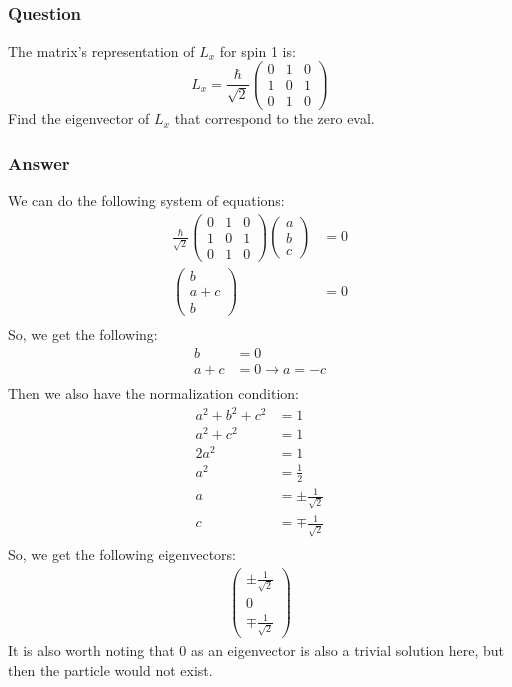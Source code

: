 \documentclass[12pt]{article}
\begin{document}
\subsection{}
\subsubsection{Question}
The matrix's representation of $L_x$ for spin 1 is:
\begin{equation}
L_x = \frac{\hbar}{\sqrt{2}}\begin{pmatrix}
0 & 1 & 0\\
1 & 0 & 1\\
0 & 1 & 0
\end{pmatrix}
\end{equation}
Find the eigenvector of $L_x$ that correspond to the zero eval.
\subsubsection{Answer}
We can do the following system of equations:
\begin{align*}
\frac{\hbar}{\sqrt{2}}\begin{pmatrix}
0 & 1 & 0\\
1 & 0 & 1\\
0 & 1 & 0
\end{pmatrix}\begin{pmatrix}
a\\
b\\
c
\end{pmatrix} &= 0\\
\begin{pmatrix}
b\\
a+c\\
b
\end{pmatrix} &= 0\\
\end{align*}
So, we get the following:
\begin{align*}
b &= 0\\
a+c &= 0\rightarrow a=-c\\
\end{align*}
Then we also have the normalization condition:
\begin{align*}
a^2+b^2+c^2 &= 1\\
a^2+c^2 &= 1\\
2a^2 &= 1\\
a^2 &= \frac{1}{2}\\
a &= \pm \frac{1}{\sqrt{2}}\\
c &= \mp \frac{1}{\sqrt{2}}\\
\end{align*}
So, we get the following eigenvectors:
\begin{align*}
\begin{pmatrix}
\pm\frac{1}{\sqrt{2}}\\
0\\
\mp\frac{1}{\sqrt{2}}
\end{pmatrix}
\end{align*}
It is also worth noting that 0 as an eigenvector is also a trivial solution here, but then the particle would not exist.
\end{document}

